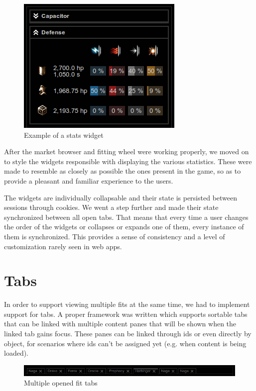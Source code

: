 \begin{figure}[h]
\centering
\includegraphics[scale=0.5]{src/img/stats}
\caption{Example of a stats widget}
\label{fig:stats}
\end{figure}

After the market browser and fitting wheel were working properly, we moved on to style the widgets responsible with displaying the various statistics. These were made to resemble as closely as possible the ones present in the game, so as to provide a pleasant and familiar experience to the users.

The widgets are individually collapsable and their state is persisted between sessions through cookies. We went a step further and made their state synchronized between all open tabs. That means that every time a user changes the order of the widgets or collapses or expands one of them, every instance of them is synchronized. This provides a sense of consistency and a level of customization rarely seen in web apps.


\section{Tabs}

In order to support viewing multiple fits at the same time, we had to implement support for tabs. A proper framework was written which supports sortable tabs that can be linked with multiple content panes that will be shown when the linked tab gains focus. These panes can be linked through ids or even directly by object, for scenarios where ids can’t be assigned yet (e.g. when content is being loaded).

\begin{figure}[h]
\centering
\includegraphics[width=0.7\linewidth]{src/img/tabs}
\caption{Multiple opened fit tabs}
\label{fig:tabs}
\end{figure}

